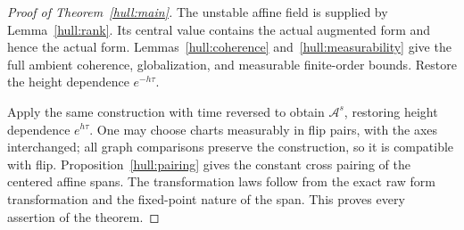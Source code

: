\begin{proof}[Proof of Theorem~\ref{hull:main}]
The unstable affine field is supplied by
Lemma~\ref{hull:rank}. Its central value contains the actual
augmented form and hence the actual form. Lemmas~\ref{hull:coherence}
and~\ref{hull:measurability} give the full ambient coherence,
globalization, and measurable finite-order bounds. Restore the
height dependence $e^{-h\tau}$.

Apply the same construction with time reversed to obtain
$\mathcal A^s$, restoring height dependence $e^{h\tau}$. One may
choose charts measurably in flip pairs, with the axes interchanged;
all graph comparisons preserve the construction, so it is compatible
with flip. Proposition~\ref{hull:pairing} gives the constant cross
pairing of the centered affine spans. The transformation laws follow
from the exact raw form transformation and the fixed-point nature of
the span. This proves every assertion of the theorem.
\end{proof}

